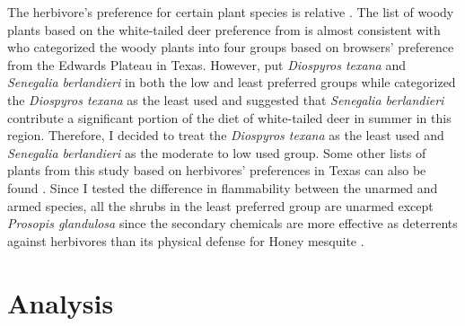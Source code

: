 \documentclass[12pt]{report}
\begin{document}
The herbivore’s preference for certain plant species is relative \citep{wright2003white}. The list of woody plants based on the white-tailed deer preference from \citep{wright2003white} is almost consistent with \citep{nelle1996management} who categorized the woody plants into four groups based on browsers’ preference from the Edwards Plateau in Texas. However,  \citep{wright2003white} put \emph{Diospyros texana} and \emph{Senegalia berlandieri} in both the low and least preferred groups while \citep{nelle1996management} categorized the \emph{Diospyros texana} as the least used and \citep*{varner1987southern} suggested that \emph{Senegalia berlandieri} contribute a significant portion of the diet of white-tailed deer in summer in this region.  Therefore, I decided to treat the \emph{Diospyros texana} as the least used and \emph{Senegalia berlandieri} as the moderate to low used group. Some other lists of plants from this study based on herbivores’ preferences in Texas can also be found \citep{arnold1979seasonallist, nelle2001ecological, everitt1974springfoodhabit, dillard2006whitetaileddeer}. Since I tested the difference in flammability between the unarmed and armed species, all the shrubs in the least preferred group are unarmed except \emph{Prosopis glandulosa} since the secondary chemicals are more effective as deterrents against herbivores than its physical defense for Honey mesquite \citep{wright2003white}.



\section{Analysis}
\end{document}
